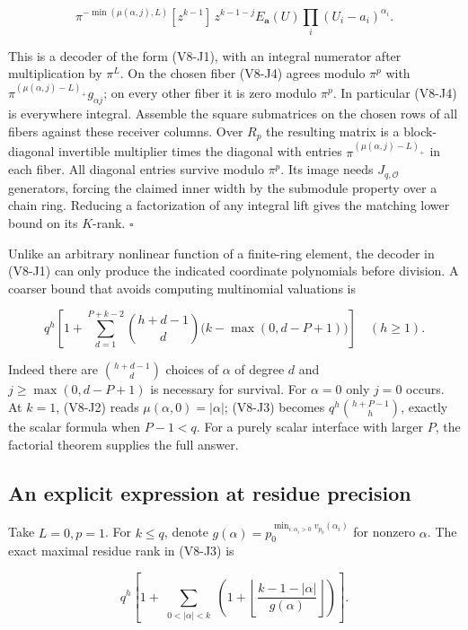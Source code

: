 \documentclass[
  11pt,
]{article}
\begin{document}
\[
 \pi^{-\min(\mu(\alpha,j),L)}
 [z^{k-1}]\,
 z^{k-1-j}E_{\boldsymbol a}(U)
              \prod_i(U_i-a_i)^{\alpha_i}.
                                                                    \tag{V8-J4}
\]

This is a decoder of the form (V8-J1), with an integral numerator after
multiplication by \(\pi^L\). On the chosen fiber (V8-J4) agrees modulo
\(\pi^p\) with \(\pi^{(\mu(\alpha,j)-L)_+}g_{\alpha j}\); on every other
fiber it is zero modulo \(\pi^p\). In particular (V8-J4) is everywhere
integral. Assemble the square submatrices on the chosen rows of all
fibers against these receiver columns. Over \(R_p\) the resulting matrix
is a block-diagonal invertible multiplier times the diagonal with
entries \(\pi^{(\mu(\alpha,j)-L)_+}\) in each fiber. All diagonal
entries survive modulo \(\pi^p\). Its image needs \(J_{q,\mathcal O}\)
generators, forcing the claimed inner width by the submodule property
over a chain ring. Reducing a factorization of any integral lift gives
the matching lower bound on its \(K\)-rank. \(\square\)

Unlike an arbitrary nonlinear function of a finite-ring element, the
decoder in (V8-J1) can only produce the indicated coordinate polynomials
before division. A coarser bound that avoids computing multinomial
valuations is

\[
 q^h\!\left[1+\sum_{d=1}^{P+k-2}{h+d-1\choose d}
                  \big(k-\max(0,d-P+1)\big)\right]\quad(h\ge1).       \tag{V8-J5}
\]

Indeed there are \({h+d-1\choose d}\) choices of \(\alpha\) of degree
\(d\) and \(j\ge\max(0,d-P+1)\) is necessary for survival. For
\(\alpha=0\) only \(j=0\) occurs. At \(k=1\), (V8-J2) reads
\(\mu(\alpha,0)=|\alpha|\); (V8-J3) becomes \(q^h{h+P-1\choose h}\),
exactly the scalar formula when \(P-1<q\). For a purely scalar interface
with larger \(P\), the factorial theorem supplies the full answer.

\subsection{An explicit expression at residue
precision}\label{v8-an-explicit-expression-at-residue-precision}

Take \(L=0,p=1\). For \(k\le q\), denote
\(g(\alpha)=p_0^{\min_{i:\alpha_i>0}v_{p_0}(\alpha_i)}\) for nonzero
\(\alpha\). The exact maximal residue rank in (V8-J3) is

\[
 q^h\left[1+\sum_{\substack{0<|\alpha|<k}}
       \left(1+\left\lfloor\frac{k-1-|\alpha|}{g(\alpha)}\right\rfloor\right)
                                                         \right].    \tag{V8-J6}
\]
\end{document}
